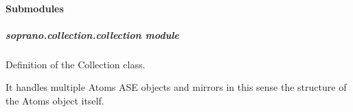 \documentclass[letterpaper,10pt,english]{sphinxmanual}
\begin{document}
\paragraph{Submodules}
\label{doctree/soprano.collection:submodules}

\subparagraph{soprano.collection.collection module}
\label{doctree/soprano.collection.collection:module-soprano.collection.collection}\label{doctree/soprano.collection.collection::doc}\label{doctree/soprano.collection.collection:soprano-collection-collection-module}
Definition of the Collection class.

It handles multiple Atoms ASE objects and mirrors in this sense the structure
of the Atoms object itself.
\end{document}
